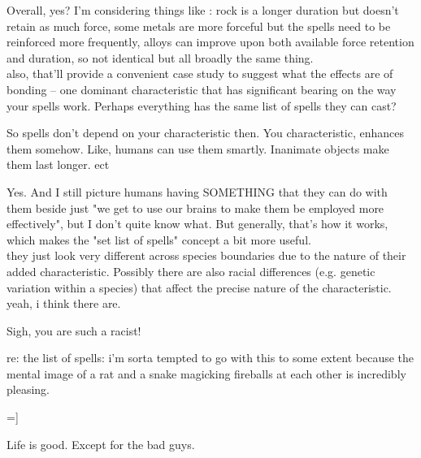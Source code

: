\R Overall, yes? I'm considering things like :  rock is a longer duration but
doesn't retain as much force, some metals are more forceful but the spells need
to be reinforced more frequently, alloys can improve upon both available force
retention and duration, so not identical but all broadly the same thing. \\
also, that'll provide a convenient case study to suggest what the effects are of
bonding -- one dominant characteristic that has significant bearing on the way
your spells work.  Perhaps everything has the same list of spells they can cast?
 

\A So spells don’t depend on your characteristic then. You characteristic,
enhances them somehow. Like, humans can use them smartly. Inanimate objects make
them last longer. ect  

\R Yes.  And I still picture humans having SOMETHING that they can do with them
beside just "we get to use our brains to make them be employed more
effectively", but I don't quite know what.  But generally, that's how it works,
which makes the "set list of spells" concept a bit more useful. \\

they just look very different across species boundaries due to the nature of
their added characteristic.  Possibly there are also racial differences (e.g.
genetic variation within a species) that affect the precise nature of the
characteristic. yeah, i think there are.   

\A Sigh, you are such a racist!  

\R re: the list of spells: i'm sorta tempted to go with this to some extent
because the mental image of a rat and a snake magicking fireballs at each other
is incredibly pleasing.  

\A =]  

\R Life is good.  Except for the bad guys.   

\E


